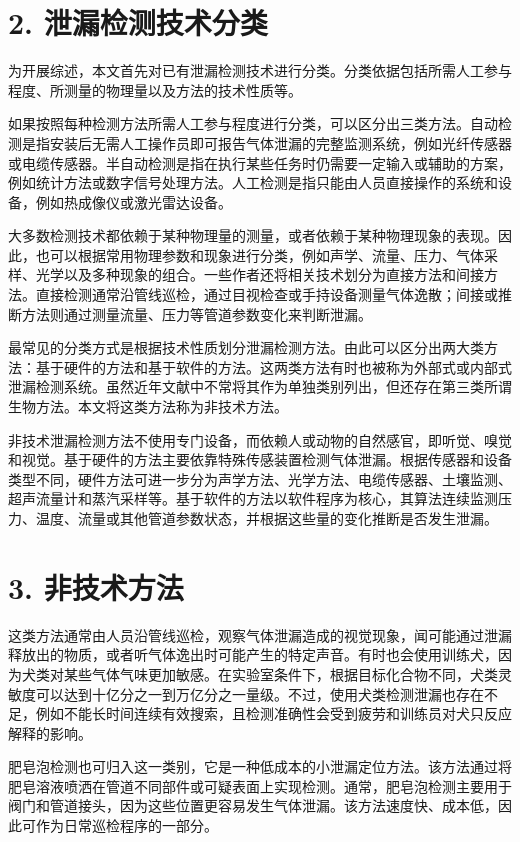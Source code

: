 \section*{2. 泄漏检测技术分类}

为开展综述，本文首先对已有泄漏检测技术进行分类。分类依据包括所需人工参与程度、所测量的物理量以及方法的技术性质等。

如果按照每种检测方法所需人工参与程度进行分类，可以区分出三类方法。自动检测是指安装后无需人工操作员即可报告气体泄漏的完整监测系统，例如光纤传感器或电缆传感器。半自动检测是指在执行某些任务时仍需要一定输入或辅助的方案，例如统计方法或数字信号处理方法。人工检测是指只能由人员直接操作的系统和设备，例如热成像仪或激光雷达设备。

大多数检测技术都依赖于某种物理量的测量，或者依赖于某种物理现象的表现。因此，也可以根据常用物理参数和现象进行分类，例如声学、流量、压力、气体采样、光学以及多种现象的组合。一些作者还将相关技术划分为直接方法和间接方法。直接检测通常沿管线巡检，通过目视检查或手持设备测量气体逸散；间接或推断方法则通过测量流量、压力等管道参数变化来判断泄漏。

最常见的分类方式是根据技术性质划分泄漏检测方法。由此可以区分出两大类方法：基于硬件的方法和基于软件的方法。这两类方法有时也被称为外部式或内部式泄漏检测系统。虽然近年文献中不常将其作为单独类别列出，但还存在第三类所谓生物方法。本文将这类方法称为非技术方法。

非技术泄漏检测方法不使用专门设备，而依赖人或动物的自然感官，即听觉、嗅觉和视觉。基于硬件的方法主要依靠特殊传感装置检测气体泄漏。根据传感器和设备类型不同，硬件方法可进一步分为声学方法、光学方法、电缆传感器、土壤监测、超声流量计和蒸汽采样等。基于软件的方法以软件程序为核心，其算法连续监测压力、温度、流量或其他管道参数状态，并根据这些量的变化推断是否发生泄漏。

\section*{3. 非技术方法}

这类方法通常由人员沿管线巡检，观察气体泄漏造成的视觉现象，闻可能通过泄漏释放出的物质，或者听气体逸出时可能产生的特定声音。有时也会使用训练犬，因为犬类对某些气体气味更加敏感。在实验室条件下，根据目标化合物不同，犬类灵敏度可以达到十亿分之一到万亿分之一量级。不过，使用犬类检测泄漏也存在不足，例如不能长时间连续有效搜索，且检测准确性会受到疲劳和训练员对犬只反应解释的影响。

肥皂泡检测也可归入这一类别，它是一种低成本的小泄漏定位方法。该方法通过将肥皂溶液喷洒在管道不同部件或可疑表面上实现检测。通常，肥皂泡检测主要用于阀门和管道接头，因为这些位置更容易发生气体泄漏。该方法速度快、成本低，因此可作为日常巡检程序的一部分。

